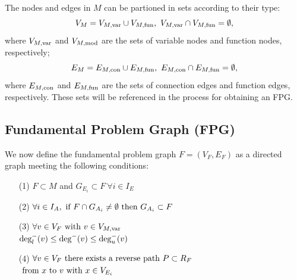 The nodes and edges in $M$ can be partioned in sets according to their type:
\begin{equation}
V_M = V_{M,\txt{var}} \cup V_{M,\txt{fun}}, \ V_{M,\txt{var}} \cap V_{M,\txt{fun}} = \emptyset,
\end{equation}
where $V_{M,\textrm{var}}$ and $V_{M,\textrm{mod}}$ are the sets of variable nodes and function nodes, respectively;
\begin{equation}
E_M = E_{M,\textrm{con}} \cup E_{M,\textrm{fun}}, \ E_{M,\textrm{con}} \cap E_{M,\textrm{fun}} = \emptyset,
\end{equation}
where $ E_{M,\textrm{con}}$ and $E_{M,\textrm{fun}}$ are the sets of connection edges and function edges, respectively. These sets will be referenced in the process for obtaining an FPG.

\subsection{Fundamental Problem Graph (FPG)}
    \label{ss:FPG}
    We now define the fundamental problem graph $F=(V_F,E_F)$ as a directed graph meeting the following conditions:
    \begin{enumerate}
    \item[(1)] $F \subset M$ and $G_{E_i} \subset F  \ \forall i \in I_E$
    \item[(2)] $\displaystyle{\forall i \in I_A, \textrm{ if } F \cap G_{A_i} \neq \emptyset \textrm{ then } G_{A_i} \subset F}$
    \item[(3)] $\displaystyle{\forall v \in V_F \textrm{ with }v \in V_{M,\textrm{var}}}$  \\
			 $\displaystyle{ \textrm{deg}_l^-(v) \leq \textrm{deg}^-(v) \leq \textrm{deg}_u^-(v)}$
    \item[(4)] $\displaystyle{\forall v \in V_F \textrm{ there exists a reverse path } P \subset R_F }$ \\
			$\displaystyle{\textrm{ from } x \textrm{ to } v \textrm{ with } x\in V_{E_i}}$
    \end{enumerate}
